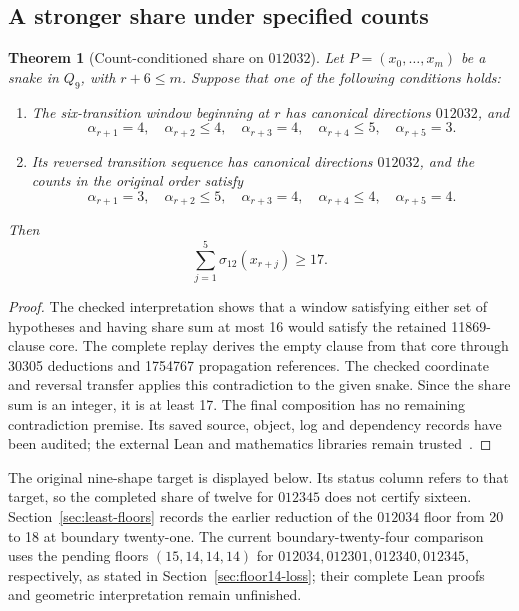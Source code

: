 \documentclass[11pt,a4paper]{article}
\newtheorem{theorem}{Theorem}[section]
\theoremstyle{definition}
\theoremstyle{remark}
\newcommand{\Q}{Q}
\begin{document}
\subsection{A stronger share under specified counts}
\begin{theorem}[Count-conditioned share on $012032$]
\label{thm:critical-count-share17}
Let $P=(x_0,\ldots,x_m)$ be a snake in $\Q_9$, with $r+6\le m$.
Suppose that one of the following conditions holds:
\begin{enumerate}
\item The six-transition window beginning at $r$ has canonical directions
$012032$, and
\[
\alpha_{r+1}=4,\quad \alpha_{r+2}\le4,\quad
\alpha_{r+3}=4,\quad \alpha_{r+4}\le5,\quad \alpha_{r+5}=3.
\]
\item Its reversed transition sequence has canonical directions $012032$,
and the counts in the original order satisfy
\[
\alpha_{r+1}=3,\quad \alpha_{r+2}\le5,\quad
\alpha_{r+3}=4,\quad \alpha_{r+4}\le4,\quad \alpha_{r+5}=4.
\]
\end{enumerate}
Then
\[
\sum_{j=1}^{5}\sigma_{12}(x_{r+j})\ge17.
\]
\end{theorem}
\begin{proof}
The checked interpretation shows that a window satisfying either set of
hypotheses and having share sum at most 16 would satisfy the retained
11869-clause core. The complete replay derives the empty clause from
that core through 30305 deductions and 1754767 propagation references.
The checked coordinate and reversal transfer applies this contradiction
to the given snake. Since the share sum is an integer, it is at least 17.
The final composition has no remaining contradiction premise. Its saved
source, object, log and dependency records have been audited; the external
Lean and mathematics libraries remain trusted~\cite{broader154archive,share155archive}.
\end{proof}
The original nine-shape target is displayed below. Its status column refers to that target, so the completed share of twelve for $012345$ does not certify sixteen. Section~\ref{sec:least-floors} records the earlier reduction of the $012034$ floor from 20 to 18 at boundary twenty-one. The current boundary-twenty-four comparison uses the pending floors $(15,14,14,14)$ for $012034,012301,012340,012345$, respectively, as stated in Section~\ref{sec:floor14-loss}; their complete Lean proofs and geometric interpretation remain unfinished.
\end{document}
